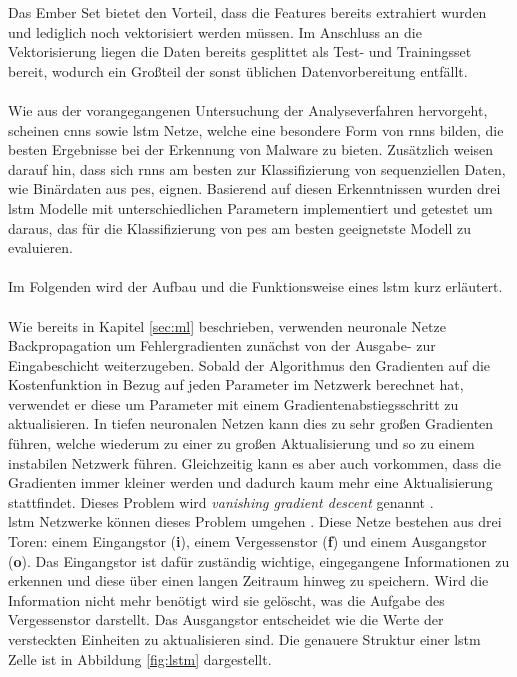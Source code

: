 \documentclass[
    12pt, %
    DIV10,
    ngerman, %
    a4paper, %
    oneside, %
    titlepage, %
    parskip=half, %
    headings=normal, %
    listof=totoc, %
    bibliography=totoc, %
    index=totoc, %
    captions=tableheading, %
    final %
]{scrreprt}
\begin{document}
Das Ember Set bietet den Vorteil, dass die Features bereits extrahiert wurden und lediglich noch vektorisiert werden müssen. Im Anschluss an die Vektorisierung liegen die Daten bereits gesplittet als Test- und Trainingsset bereit, wodurch ein Gro{\ss}teil der sonst üblichen Datenvorbereitung entfällt.\\\\
Wie aus der vorangegangenen Untersuchung der Analyseverfahren hervorgeht, scheinen \ac{cnns} sowie \ac{lstm} Netze, welche eine besondere Form von \ac{rnns} bilden, die besten Ergebnisse bei der Erkennung von Malware zu bieten. Zusätzlich weisen \textcite{JoshuaSaxe2018} darauf hin, dass sich \ac{rnns} am besten zur Klassifizierung von sequenziellen Daten, wie Binärdaten aus \ac{pes}, eignen. Basierend auf diesen Erkenntnissen wurden drei \ac{lstm} Modelle mit unterschiedlichen Parametern implementiert und getestet um daraus, das für die Klassifizierung von \ac{pes} am besten geeignetste Modell zu evaluieren.\\\\
Im Folgenden wird der Aufbau und die Funktionsweise eines \ac{lstm} kurz erläutert.\\\\
Wie bereits in Kapitel \ref{sec:ml} beschrieben, verwenden neuronale Netze Backpropagation um Fehlergradienten zunächst von der Ausgabe- zur Eingabeschicht weiterzugeben. Sobald der Algorithmus den Gradienten auf die Kostenfunktion in Bezug auf jeden Parameter im Netzwerk berechnet hat, verwendet er diese um Parameter mit einem Gradientenabstiegsschritt zu aktualisieren. In tiefen neuronalen Netzen kann dies zu sehr gro{\ss}en Gradienten führen, welche wiederum zu einer zu gro{\ss}en Aktualisierung und so zu einem instabilen Netzwerk führen. Gleichzeitig kann es aber auch vorkommen, dass die Gradienten immer kleiner werden und dadurch kaum mehr eine Aktualisierung stattfindet. Dieses Problem wird \emph{vanishing gradient descent} genannt \parencite{geron2019hands}.\\
\ac{lstm} Netzwerke können dieses Problem umgehen \parencite{hochreiter1997long}. Diese Netze bestehen aus drei Toren: einem Eingangstor (\textbf{i}), einem Vergessenstor (\textbf{f}) und einem Ausgangstor (\textbf{o}). Das Eingangstor ist dafür zuständig wichtige, eingegangene Informationen zu erkennen und diese über einen langen Zeitraum hinweg zu speichern. Wird die Information nicht mehr benötigt wird sie gelöscht, was die Aufgabe des Vergessenstor darstellt. Das Ausgangstor entscheidet wie die Werte der versteckten Einheiten zu aktualisieren sind. Die genauere Struktur einer \ac{lstm} Zelle ist in Abbildung \ref{fig:lstm} dargestellt.
\end{document}

